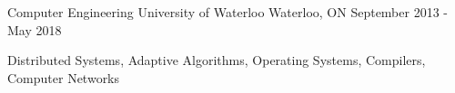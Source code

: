 

\begin{cventries}

  \cventry
    {Computer Engineering} %
    {University of Waterloo} %
    {Waterloo, ON} %
    {September 2013 - May 2018} %
    {
      \begin{cvitems} %
      \item {Distributed Systems, Adaptive Algorithms, Operating Systems, Compilers, Computer Networks}
      \end{cvitems}
    }

\end{cventries}
